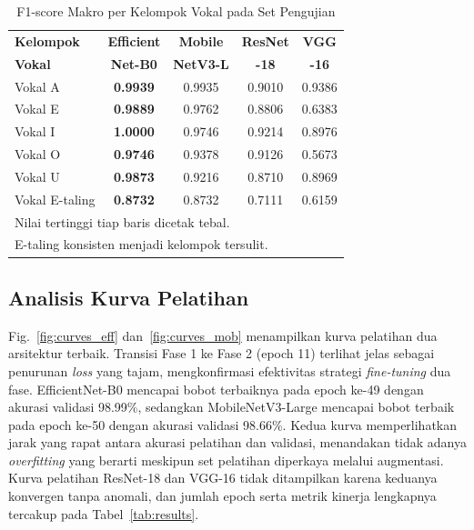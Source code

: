 \documentclass[conference]{IEEEtran}
\begin{document}
\begin{table}[t]
\caption{F1-score Makro per Kelompok Vokal pada Set Pengujian}
\label{tab:per_vowel}
\begin{center}
\renewcommand{\arraystretch}{1.3}
\small
\begin{tabular}{lcccc}
\toprule
\textbf{Kelompok} & \textbf{Efficient} & \textbf{Mobile}
  & \textbf{ResNet} & \textbf{VGG} \\
\textbf{Vokal} & \textbf{Net-B0} & \textbf{NetV3-L}
  & \textbf{-18} & \textbf{-16} \\
\midrule
Vokal A        & \textbf{0.9939} & 0.9935 & 0.9010 & 0.9386 \\
Vokal E        & \textbf{0.9889} & 0.9762 & 0.8806 & 0.6383 \\
Vokal I        & \textbf{1.0000} & 0.9746 & 0.9214 & 0.8976 \\
Vokal O        & \textbf{0.9746} & 0.9378 & 0.9126 & 0.5673 \\
Vokal U        & \textbf{0.9873} & 0.9216 & 0.8710 & 0.8969 \\
Vokal E-taling & \textbf{0.8732} & 0.8732 & 0.7111 & 0.6159 \\
\bottomrule
\multicolumn{5}{l}{\footnotesize Nilai tertinggi tiap baris dicetak tebal.} \\
\multicolumn{5}{l}{\footnotesize E-taling konsisten menjadi kelompok tersulit.}
\end{tabular}
\end{center}
\end{table}

\subsection{Analisis Kurva Pelatihan}

Fig.~\ref{fig:curves_eff} dan~\ref{fig:curves_mob} menampilkan
kurva pelatihan dua arsitektur terbaik.
Transisi Fase 1 ke Fase 2 (epoch 11) terlihat jelas sebagai
penurunan \textit{loss} yang tajam, mengkonfirmasi efektivitas
strategi \textit{fine-tuning} dua fase.
EfficientNet-B0 mencapai bobot terbaiknya pada epoch ke-49 dengan
akurasi validasi 98.99\%, sedangkan MobileNetV3-Large mencapai
bobot terbaik pada epoch ke-50 dengan akurasi validasi 98.66\%.
Kedua kurva memperlihatkan jarak yang rapat antara akurasi
pelatihan dan validasi, menandakan tidak adanya \textit{overfitting}
yang berarti meskipun set pelatihan diperkaya melalui augmentasi.
Kurva pelatihan ResNet-18 dan VGG-16 tidak ditampilkan karena
keduanya konvergen tanpa anomali, dan jumlah epoch serta metrik
kinerja lengkapnya tercakup pada Tabel~\ref{tab:results}.
\end{document}
